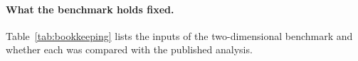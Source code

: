 \paragraph{What the benchmark holds fixed.} Table~\ref{tab:bookkeeping} lists the inputs of the two-dimensional benchmark and whether each was compared with the published analysis.
